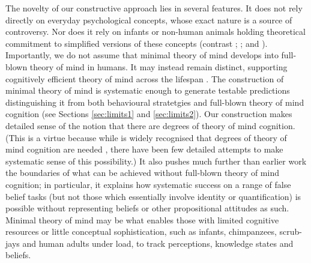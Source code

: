 \documentclass[12pt,\papersize]{extarticle}
\begin{document}
The novelty of our constructive approach lies in several features.  It does not rely directly on everyday psychological concepts, whose exact nature is a source of controversy.
Nor does it rely on infants or non-human animals holding theoretical commitment to simplified versions of these concepts (contrast 
	\citealp{en_75};
	\citealp{en_81};
	\citealp{en_2372} and
	\citealp{en_1614}%
).
Importantly, we do not assume that minimal theory of mind develops into full-blown theory of mind in humans.  
It may instead remain distinct, supporting cognitively efficient theory of mind across the lifespan \citep[see][]{Samson:2010jm, en_2397}.  The construction of minimal theory of mind is systematic enough to generate testable predictions distinguishing it from both behavioural stratetgies and full-blown theory of mind cognition (see Sections \ref{sec:limits1} and \ref{sec:limits2}).  
Our construction makes detailed sense of the notion that there are degrees of theory of mind cognition.  
(This is a virtue because while is widely recognised that degrees of theory of mind cognition are needed \citep[e.g.][]{en_610, en_1415}, there have been few detailed attempts to make systematic sense of this possibility.)
It also pushes much further than earlier work the boundaries of what can be achieved without full-blown theory of mind cognition; in particular, it explains how systematic success on a range of false belief tasks (but not those which essentially involve identity or quantification) is possible without representing beliefs or other propositional attitudes as such. Minimal theory of mind may be what enables those with limited cognitive resources or little conceptual sophistication, such as infants, chimpanzees, scrub-jays and human adults under load,  to track  perceptions, knowledge states and beliefs. 


















\small

\end{document}

